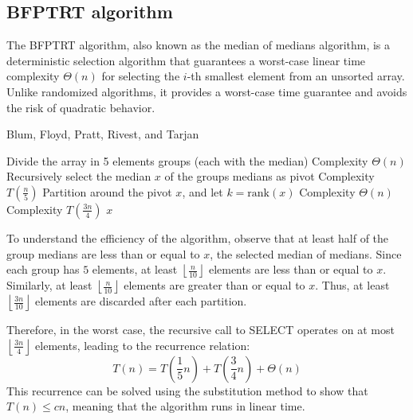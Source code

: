 \subsection{BFPTRT algorithm}
The BFPTRT algorithm, also known as the median of medians algorithm, is a deterministic selection algorithm that guarantees a worst-case linear time complexity $\Theta(n)$ for selecting the $i$-th smallest element from an unsorted array. 
Unlike randomized algorithms, it provides a worst-case time guarantee and avoids the risk of quadratic behavior.
\begin{algorithm}[H]
    \caption{Blum, Floyd, Pratt, Rivest, and Tarjan}
    \begin{algorithmic}[1]
            \State Divide the array in 5 elements groups (each with the median) \Comment Complexity $\Theta(n)$
            \State Recursively select the median $x$ of the groups medians as pivot \Comment Complexity $T\left(\frac{n}{5}\right)$
            \State Partition around the pivot $x$, and let $k = \text{rank}(x)$ \Comment Complexity $\Theta(n)$
             \Comment Complexity $T\left(\frac{3n}{4}\right)$
                \State \Return $x$ 
                \State {}
            \Else 
                \State {}
            \EndIf
        \EndFunction
    \end{algorithmic}
\end{algorithm}  
To understand the efficiency of the algorithm, observe that at least half of the group medians are less than or equal to $x$, the selected median of medians.
Since each group has $5$ elements, at least $\left\lfloor\frac{n}{10}\right\rfloor$ elements are less than or equal to $x$. 
Similarly, at least $\left\lfloor\frac{n}{10}\right\rfloor$ elements are greater than or equal to $x$. 
Thus, at least $\left\lfloor\frac{3n}{10}\right\rfloor$ elements are discarded after each partition.

Therefore, in the worst case, the recursive call to SELECT operates on at most $\left\lfloor\frac{3n}{4}\right\rfloor$ elements, leading to the recurrence relation:
\[T(n)=T\left(\dfrac{1}{5}n\right)+T\left(\dfrac{3}{4}n\right)+\Theta(n)\]
This recurrence can be solved using the substitution method to show that $T(n)\leq cn$, meaning that the algorithm runs in linear time.

